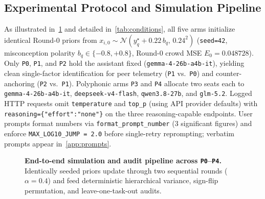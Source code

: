 \documentclass[11pt,letterpaper]{article}
\theoremstyle{plain}
\newcommand{\code}[1]{\nolinkurl{#1}}
\begin{document}
\subsection{Experimental Protocol and Simulation Pipeline}

As illustrated in~\cref{fig:pipeline} and detailed in~\cref{tab:conditions}, all five arms initialize identical Round-0 priors from $x_{i,0} \sim \mathcal{N}(y_q^\star + 0.22\,b_q,\, 0.24^2)$ (\texttt{seed=42}, misconception polarity $b_q \in \{-0.8, +0.8\}$, Round-0 crowd MSE $E_0 = 0.048728$). Only \texttt{P0}, \texttt{P1}, and \texttt{P2} hold the assistant fixed (\texttt{gemma-4-26b-a4b-it}), yielding clean single-factor identification for peer telemetry (\texttt{P1} vs.\ \texttt{P0}) and counter-anchoring (\texttt{P2} vs.\ \texttt{P1}). Polyphonic arms \texttt{P3} and \texttt{P4} allocate two seats each to \texttt{gemma-4-26b-a4b-it}, \texttt{deepseek-v4-flash}, \texttt{qwen3.8-27b}, and \texttt{glm-5.2}. Logged HTTP requests omit \texttt{temperature} and \texttt{top\_p} (using API provider defaults) with \texttt{reasoning=\{"effort":"none"\}} on the three reasoning-capable endpoints. User prompts format numbers via \code{format\_prompt\_number} (3 significant figures) and enforce \code{MAX\_LOG10\_JUMP = 2.0} before single-retry reprompting; verbatim prompts appear in~\cref{app:prompts}.

\begin{figure}[t]
  \centering
  \caption{\textbf{End-to-end simulation and audit pipeline across \texttt{P0}--\texttt{P4}.} Identically seeded priors update through two sequential rounds ($\alpha=0.4$) and feed deterministic hierarchical variance, sign-flip permutation, and leave-one-task-out audits.}
  \label{fig:pipeline}
\end{figure}
\end{document}
